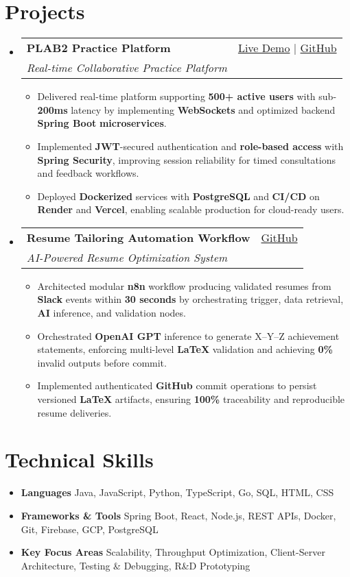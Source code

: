 \documentclass[letterpaper,11pt]{article}
\makeatletter
\newcommand{\resumeItem}[1]{\item\small{#1 \vspace{-2pt}}}
\newcommand{\resumeSubheading}[4]{
  \vspace{-1pt}\item
    \begin{tabular*}{0.97\textwidth}[t]{l@{\extracolsep{\fill}}r}
      \textbf{#1} & #2 \\
      \textit{\small#3} & \textit{\small #4} \\
    \end{tabular*}\vspace{-5pt}
}
\newcommand{\resumeSubHeadingListStart}{\begin{itemize}[leftmargin=*]}
\newcommand{\resumeSubHeadingListEnd}{\end{itemize}}
\newcommand{\resumeItemListStart}{\begin{itemize}}
\newcommand{\resumeItemListEnd}{\end{itemize}\vspace{-5pt}}
\makeatother
\begin{document}
\section{Projects}
  \resumeSubHeadingListStart
    \resumeSubheading
      {\textbf{PLAB2 Practice Platform}}{\href{https://plab2practice.com}{Live Demo} | \href{https://github.com/altansaid/plab2projectnew}{GitHub}}
      {Real-time Collaborative Practice Platform}{}
      \resumeItemListStart
        \resumeItem{Delivered real-time platform supporting \textbf{500+ active users} with sub-\textbf{200ms} latency by implementing \textbf{WebSockets} and optimized backend \textbf{Spring Boot} \textbf{microservices}.}
        \resumeItem{Implemented \textbf{JWT}-secured authentication and \textbf{role-based access} with \textbf{Spring Security}, improving session reliability for timed consultations and feedback workflows.}
        \resumeItem{Deployed \textbf{Dockerized} services with \textbf{PostgreSQL} and \textbf{CI/CD} on \textbf{Render} and \textbf{Vercel}, enabling scalable production for cloud-ready users.}
      \resumeItemListEnd

    \resumeSubheading
      {\textbf{Resume Tailoring Automation Workflow}}{\href{https://github.com/altansaid/resume-automation-workflow}{GitHub}}
      {AI-Powered Resume Optimization System}{}
      \resumeItemListStart
    \resumeItem{Architected modular \textbf{n8n} workflow producing validated resumes from \textbf{Slack} events within \textbf{30 seconds} by orchestrating trigger, data retrieval, \textbf{AI} inference, and validation nodes.}
    \resumeItem{Orchestrated \textbf{OpenAI GPT} inference to generate X--Y--Z achievement statements, enforcing multi-level \textbf{LaTeX} validation and achieving \textbf{0\%} invalid outputs before commit.}
    \resumeItem{Implemented authenticated \textbf{GitHub} commit operations to persist versioned \textbf{LaTeX} artifacts, ensuring \textbf{100\%} traceability and reproducible resume deliveries.}



      \resumeItemListEnd
  \resumeSubHeadingListEnd

\section{Technical Skills}
  \resumeItemListStart
    \resumeItem{\textbf{Languages}}{Java, JavaScript, Python, TypeScript, Go, SQL, HTML, CSS}
    \resumeItem{\textbf{Frameworks \& Tools}}{Spring Boot, React, Node.js, REST APIs, Docker, Git, Firebase, GCP, PostgreSQL}
    \resumeItem{\textbf{Key Focus Areas}}{Scalability, Throughput Optimization, Client-Server Architecture, Testing \& Debugging, R\&D Prototyping}
  \resumeItemListEnd
\end{document}

